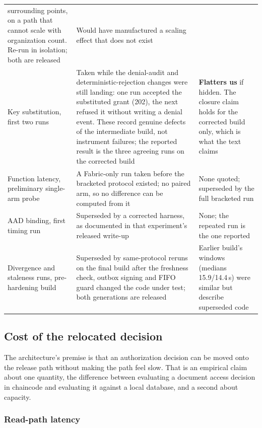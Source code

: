 \documentclass[preprint,12pt]{elsarticle}
\begin{document}
\begin{table}[!t]
\begin{tabular}{@{}>{\raggedright\arraybackslash}p{}%
                 >{\raggedright\arraybackslash}p{}%
                 >{\raggedright\arraybackslash}p{}@{}}
surrounding points, on a path that cannot scale with organization count. Re-run
in isolation; both are released &
Would have manufactured a scaling effect that does not exist \\
\addlinespace
Key substitution, first two runs &
Taken while the denial-audit and deterministic-rejection changes were still
landing: one run accepted the substituted grant (202), the next refused it
without writing a denial event. These record genuine defects of the
intermediate build, not instrument failures; the reported result is the three
agreeing runs on the corrected build &
\textbf{Flatters us} if hidden. The closure claim holds for the corrected
build only, which is what the text claims \\
\addlinespace
Function latency, preliminary single-arm probe &
A Fabric-only run taken before the bracketed protocol existed; no paired arm,
so no difference can be computed from it &
None quoted; superseded by the full bracketed run \\
\addlinespace
AAD binding, first timing run &
Superseded by a corrected harness, as documented in that experiment's released
write-up &
None; the repeated run is the one reported \\
\addlinespace
Divergence and staleness runs, pre-hardening build &
Superseded by same-protocol reruns on the final build after the freshness
check, outbox signing and FIFO guard changed the code under test; both
generations are released &
Earlier build's windows (medians 15.9/14.4\,s) were similar but describe
superseded code \\
\bottomrule
\end{tabular}
\end{table}


\subsection{Cost of the relocated decision}

The architecture's premise is that an authorization decision can be moved onto
the release path without making the path feel slow. That is an empirical claim
about one quantity, the difference between evaluating a document access
decision in chaincode and evaluating it against a local database, and a
second about capacity.

\subsubsection{Read-path latency}
\label{sec:exp_latency}
\end{document}
